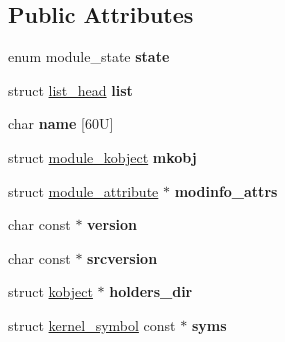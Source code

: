 \subsection*{Public Attributes}
\begin{DoxyCompactItemize}
\item 
\hypertarget{structmodule_a22f9713bc4426b9eff27f690ea168253}{}enum module\+\_\+state {\bfseries state}\label{structmodule_a22f9713bc4426b9eff27f690ea168253}

\item 
\hypertarget{structmodule_a218251048ef196fb6c6c18a993bdc89d}{}struct \hyperlink{structlist__head}{list\+\_\+head} {\bfseries list}\label{structmodule_a218251048ef196fb6c6c18a993bdc89d}

\item 
\hypertarget{structmodule_a267f1a4ac8f81e2c88d3d2570c395081}{}char {\bfseries name} \mbox{[}60\+U\mbox{]}\label{structmodule_a267f1a4ac8f81e2c88d3d2570c395081}

\item 
\hypertarget{structmodule_a86edb94d654f220808efac9d8dca03e3}{}struct \hyperlink{structmodule__kobject}{module\+\_\+kobject} {\bfseries mkobj}\label{structmodule_a86edb94d654f220808efac9d8dca03e3}

\item 
\hypertarget{structmodule_a22cd92c44dc9aa963f5e01f4ae6bd5ce}{}struct \hyperlink{structmodule__attribute}{module\+\_\+attribute} $\ast$ {\bfseries modinfo\+\_\+attrs}\label{structmodule_a22cd92c44dc9aa963f5e01f4ae6bd5ce}

\item 
\hypertarget{structmodule_a31a5bbb82c7b62a61b2d916c839b0d5b}{}char const $\ast$ {\bfseries version}\label{structmodule_a31a5bbb82c7b62a61b2d916c839b0d5b}

\item 
\hypertarget{structmodule_abc07f5ddface8d5bdb9edf6c9dc9e6dc}{}char const $\ast$ {\bfseries srcversion}\label{structmodule_abc07f5ddface8d5bdb9edf6c9dc9e6dc}

\item 
\hypertarget{structmodule_ad72d45e1ed32cf971a2a472188b2f15f}{}struct \hyperlink{structkobject}{kobject} $\ast$ {\bfseries holders\+\_\+dir}\label{structmodule_ad72d45e1ed32cf971a2a472188b2f15f}

\item 
\hypertarget{structmodule_a0e8e5e86aeda1a29dbd6f61b2f9480c3}{}struct \hyperlink{structkernel__symbol}{kernel\+\_\+symbol} const $\ast$ {\bfseries syms}\label{structmodule_a0e8e5e86aeda1a29dbd6f61b2f9480c3}


\end{DoxyCompactItemize}
